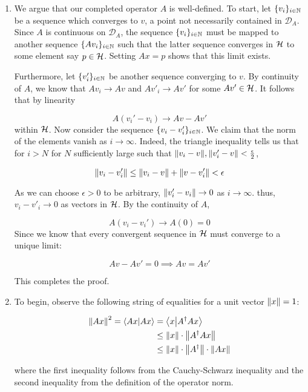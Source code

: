 \documentclass[12pt]{article}%
\begin{document}
\begin{enumerate}[i]
  \item
  We argue that our completed operator $A$ is well-defined. To start, let $\{v_i\}_{i \in \mathbb{N}}$ be a sequence which converges to $v$, a point not necessarily contained in $\mathcal{D}_A$. Since $A$ is continuous on $\mathcal{D}_A$, the sequence $\{v_i\}_{i \in \mathbb{N}}$ must be mapped to another sequence $\{Av_i\}_{i \in \mathbb{N}}$ such that the latter sequence converges in $\mathcal{H}$ to some element say $p \in \mathcal{H}$. Setting $Ax = p$ shows that this limit exists.

  Furthermore, let $\{v'_i\}_{i \in \mathbb{N}}$ be another sequence converging to $v$. By continuity of $A$, we know that $Av_i \rightarrow Av$ and $Av'_i \rightarrow Av'$ for some $Av' \in \mathcal{H}$. It follows that by linearity

  \[ A(v_i' - v_i) \rightarrow Av - Av' \]
  within $\mathcal{H}$. Now consider the sequence $\{v_i - v_i'\}_{i \in \mathbb{N}}$. We claim that the norm of the elements vanish as $i \rightarrow \infty$. Indeed, the triangle inequality tells us that for $i > N$ for $N$ sufficiently large such that $\norm{v_i - v}, \norm{v'_i - v} < \frac{\epsilon}{2}$,

  \[ \norm{v_i - v_i'} \leq \norm{v_i - v} + \norm{v - v_i'} < \epsilon \]

  As we can choose $\epsilon > 0$ to be arbitrary, $\norm{v_i' - v_i} \rightarrow 0$ as $i \rightarrow \infty$. thus, $v_i - v'_i \rightarrow 0$ as vectors in $\mathcal{H}$. By the continuity of $A$,

  \[A(v_i - v_i') \rightarrow A(0) = 0 \]
  Since we know that every convergent sequence in $\mathcal{H}$ must converge to a unique limit:

  \[ Av - Av' = 0 \implies Av = Av' \]

This completes the proof.

  \item
  To begin, observe the following string of equalities for a unit vector $\norm{x} = 1$:

  \begin{align*}
    \norm{Ax}^2 = \ip{Ax}{Ax} & = \ip{x}{A^\dagger Ax} \\
    & \leq \norm{x} \cdot \norm{A^{\dagger}Ax} \\
    & \leq \norm{x}\cdot \norm{A^\dagger} \cdot \norm{Ax}
  \end{align*}

where the first inequality follows from the Cauchy-Schwarz inequality and the second inequality from the definition of the operator norm.


\end{enumerate}
\end{document}
